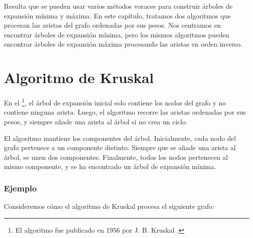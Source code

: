Resulta que se pueden usar varios métodos voraces
para construir árboles de expansión mínima y máxima.
En este capítulo, tratamos dos algoritmos
que procesan
las aristas del grafo ordenadas por sus pesos.
Nos centramos en encontrar árboles de expansión mínima,
pero los mismos algoritmos pueden encontrar
árboles de expansión máxima procesando las aristas en orden inverso.

\section{Algoritmo de Kruskal}


En el \footnote{El algoritmo fue publicado en 1956
por J. B. Kruskal \cite{kru56}.}, el árbol de expansión inicial
solo contiene los nodos del grafo
y no contiene ninguna arista.
Luego, el algoritmo recorre las aristas
ordenadas por sus pesos, y siempre añade una arista
al árbol si no crea un ciclo.

El algoritmo mantiene los componentes
del árbol.
Inicialmente, cada nodo del grafo
pertenece a un componente distinto.
Siempre que se añade una arista al árbol,
se unen dos componentes.
Finalmente, todos los nodos pertenecen al mismo componente,
y se ha encontrado un árbol de expansión mínima.

\subsubsection{Ejemplo}

\begin{samepage}
Consideremos cómo el algoritmo de Kruskal procesa el
siguiente grafo:
\begin{center}
\end{center}
\end{samepage}

